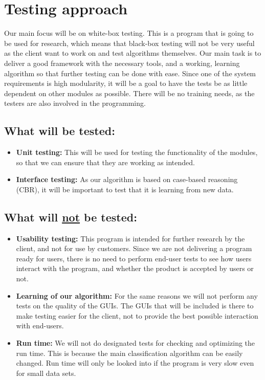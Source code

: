 \documentclass[12pt, fullpage, oneside]{report}
\begin{document}
	\section{Testing approach}
		Our main focus will be on white-box testing. This is a program that is going to be used for research, which means that black-box testing will not be very useful as the client want to work on and test algorithms themselves. Our main task is to deliver a good framework with the 				necessary tools, and a working, learning algorithm so that further testing can be done with ease. Since one of the system requirements is high modularity, it will be a goal to have the tests be as little dependent on other modules as possible. There will be no training needs, as the 				testers are also involved in the programming.

		\subsection*{What will be tested:}
			\begin{itemize}
				\renewcommand{\labelitemi}{$\bullet$}
					\item \textbf{Unit testing:} This will be used for testing the functionality of the modules, so that we can ensure that they are working as intended.
					\item \textbf{Interface testing:} As our algorithm is based on case-based reasoning (CBR), it will be important to test that it is learning from new data.
			\end{itemize}

		\subsection*{What will \underline{not} be tested:}
			\begin{itemize}
				\renewcommand{\labelitemi}{$\bullet$}
					\item \textbf{Usability testing:} This program is intended for further research by the client, and not for use by customers. Since we are not delivering a program ready for users, there is no need to perform end-user tests to see how users interact with the 							program, and whether the product is accepted by users or not.
					\item \textbf{Learning of our algorithm:} For the same reasons we will not perform any tests on the quality of the GUIs. The GUIs that will be included is there to make testing easier for the client, not to provide the best possible interaction with end-users.
					\item \textbf{Run time:} We will not do designated tests for checking and optimizing the run time. This is because the main classification algorithm can be easily changed. Run time will only be looked into if the program is very slow even for small data sets.
			\end{itemize}
		
\end{document}
